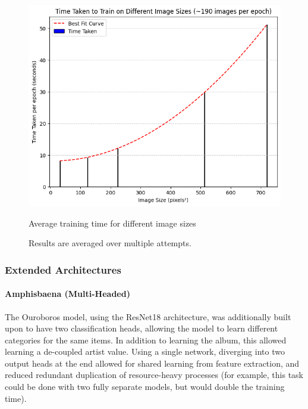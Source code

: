                         \begin{figure}[h]
                            \centering
                            \includegraphics[width=\textwidth]{images/CNNSize_Time.png}
                            \caption{Average training time for different image sizes}
                            \label{fig:CNNSize_Time}
                            \caption*{Results are averaged over multiple attempts.}
                        \end{figure}
    
            \subsubsection{Extended Architectures}
    
                \paragraph{Amphisbaena (Multi-Headed)}
    
                The Ouroboros model, using the ResNet18 architecture, was additionally built upon to have two classification heads, allowing the model to learn different categories for the same items. In addition to learning the album, this allowed learning a de-coupled artist value. Using a single network, diverging into two output heads at the end allowed for shared learning from feature extraction, and reduced redundant duplication of resource-heavy processes (for example, this task could be done with two fully separate models, but would double the training time).
    
